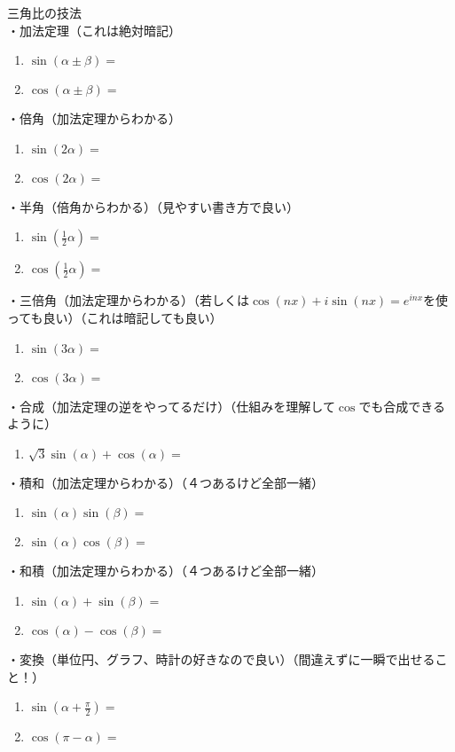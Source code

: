 \documentclass[12pt,a4paper]{jsarticle}
\begin{document}
三角比の技法\\
・加法定理（これは絶対暗記）
\begin{enumerate}
    \item $\sin(\alpha\pm\beta)=$
    \item $\cos(\alpha\pm\beta)=$
\end{enumerate}
・倍角（加法定理からわかる）
\begin{enumerate}
    \item $\sin(2\alpha)=$
    \item $\cos(2\alpha)=$
\end{enumerate}
・半角（倍角からわかる）（見やすい書き方で良い）
\begin{enumerate}
    \item $\sin(\frac{1}{2}\alpha)=$
    \item $\cos(\frac{1}{2}\alpha)=$
\end{enumerate}
・三倍角（加法定理からわかる）（若しくは$\cos(nx)+i\sin(nx)=e^{inx}$を使っても良い）（これは暗記しても良い）
\begin{enumerate}
    \item $\sin(3\alpha)=$
    \item $\cos(3\alpha)=$
\end{enumerate}
・合成（加法定理の逆をやってるだけ）（仕組みを理解して$\cos$でも合成できるように）
\begin{enumerate}
    \item $\sqrt{3}\sin(\alpha)+\cos(\alpha)=$
\end{enumerate}
・積和（加法定理からわかる）（４つあるけど全部一緒）
\begin{enumerate}
    \item $\sin(\alpha)\sin(\beta)=$
    \item $\sin(\alpha)\cos(\beta)=$
\end{enumerate}
・和積（加法定理からわかる）（４つあるけど全部一緒）
\begin{enumerate}
    \item $\sin(\alpha)+\sin(\beta)=$
    \item $\cos(\alpha)-\cos(\beta)=$
\end{enumerate}
・変換（単位円、グラフ、時計の好きなので良い）（間違えずに一瞬で出せること！）
\begin{enumerate}
    \item $\sin(\alpha+\frac{\pi}{2})=$
    \item $\cos(\pi-\alpha)=$
\end{enumerate}
\end{document}

